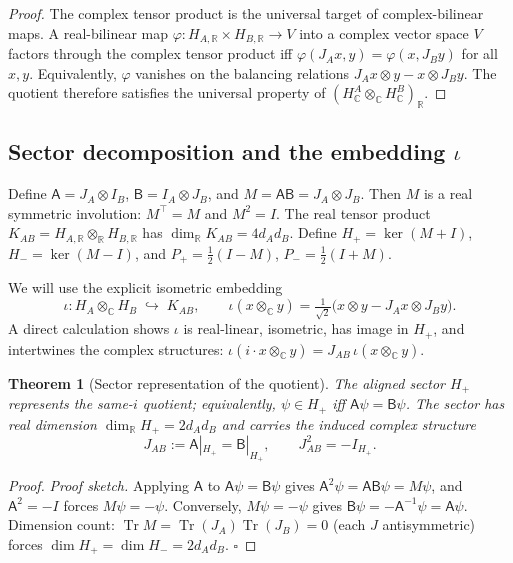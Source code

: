 \documentclass[a4paper,onecolumn,noarxiv]{quantumarticle}
\theoremstyle{plain}
\newtheorem{theorem}{Theorem}
\theoremstyle{definition}
\theoremstyle{remark}
\newcommand{\R}{\mathbb{R}}
\newcommand{\C}{\mathbb{C}}
\newcommand{\HC}{H_{\C}}
\newcommand{\KAB}{K_{AB}}
\newcommand{\Pplus}{P_{+}}
\newcommand{\Pminus}{P_{-}}
\newcommand{\Hplus}{H_{+}}
\newcommand{\Hminus}{H_{-}}
\newcommand{\Aop}{\mathsf{A}}
\newcommand{\Bop}{\mathsf{B}}
\newcommand{\Mop}{M}
\newcommand{\JAB}{J_{AB}}
\newcommand{\Tr}{\operatorname{Tr}}
\begin{document}
\begin{proof}
The complex tensor product is the universal target of complex-bilinear maps. A
real-bilinear map $\varphi:H_{A,\R}\times H_{B,\R}\to V$ into a complex vector space
$V$ factors through the complex tensor product iff $\varphi(J_A x,y)=\varphi(x,J_B y)$
for all $x,y$. Equivalently, $\varphi$ vanishes on the balancing relations
$J_A x\otimes y - x\otimes J_B y$. The quotient therefore satisfies the universal
property of $(\HC^A\otimes_\C\HC^B)_\R$.
\end{proof}

\subsection{Sector decomposition and the embedding $\iota$}
\label{ssec:sector}

Define $\Aop=J_A\otimes I_B$, $\Bop=I_A\otimes J_B$, and $\Mop=\Aop\Bop=J_A\otimes J_B$.
Then $\Mop$ is a real symmetric involution: $\Mop^\top=\Mop$ and $\Mop^2=I$.
The real tensor product $\KAB=H_{A,\R}\otimes_\R H_{B,\R}$ has $\dim_\R\KAB=4d_Ad_B$.
Define $\Hplus=\ker(\Mop+I)$, $\Hminus=\ker(\Mop-I)$, and
$\Pplus=\tfrac{1}{2}(I-\Mop)$, $\Pminus=\tfrac{1}{2}(I+\Mop)$.

We will use the explicit isometric embedding
\begin{equation}
  \iota : H_A\otimes_\C H_B \;\hookrightarrow\; \KAB, \qquad
  \iota(x\otimes_\C y) = \tfrac{1}{\sqrt{2}}\bigl(x\otimes y - J_A x\otimes J_B y\bigr).
  \label{eq:iota}
\end{equation}
A direct calculation shows $\iota$ is real-linear, isometric, has image in $\Hplus$,
and intertwines the complex structures: $\iota(i\cdot x\otimes_\C y)=\JAB\,\iota(x\otimes_\C y)$.

\begin{theorem}[Sector representation of the quotient]
\label{thm:sector}
The aligned sector $\Hplus$ represents the same-$i$ quotient; equivalently,
$\psi\in\Hplus$ iff $\Aop\psi=\Bop\psi$. The sector has real dimension
$\dim_\R\Hplus=2d_Ad_B$ and carries the induced complex structure
\begin{equation}
  \JAB := \Aop|_{\Hplus} = \Bop|_{\Hplus},\qquad \JAB^2=-I_{\Hplus}.
\end{equation}
\end{theorem}

\begin{proof}
\emph{Proof sketch.} Applying $\Aop$ to $\Aop\psi=\Bop\psi$ gives
$\Aop^2\psi=\Aop\Bop\psi=\Mop\psi$, and $\Aop^2=-I$ forces $\Mop\psi=-\psi$.
Conversely, $\Mop\psi=-\psi$ gives $\Bop\psi=-\Aop^{-1}\psi=\Aop\psi$. Dimension
count: $\Tr\Mop=\Tr(J_A)\Tr(J_B)=0$ (each $J$ antisymmetric) forces
$\dim\Hplus=\dim\Hminus=2d_Ad_B$. $\square$
\end{proof}
\end{document}
